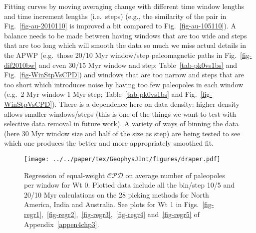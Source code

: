 Fitting curves by moving averaging change with different time window lengths and
time increment lengths (i.e.\ steps) (e.g., the similarity of the pair in
Fig.~\ref{fig-au-2010110} is improved a bit compared to
Fig.~\ref{fig-au-105110}). A balance needs to be made between having windows
that are too wide and steps that are too long which will smooth the data so much
we miss actual details in the APWP (e.g.\ those 20/10 Myr window/step
paleomagnetic paths in Fig.~\ref{fig-dif2010bw} and even 30/15 Myr window and
step; Table~\ref{tab-pk0vs1bs} and Fig.~\ref{fig-WinStpVsCPD}) and windows that
are too narrow and steps that are too short which introduces noise by having too
few paleopoles in each window (e.g.\ 2 Myr window 1 Myr step;
Table~\ref{tab-pk0vs1bs} and Fig.~\ref{fig-WinStpVsCPD}). There is a dependence
here on data density: higher density allows smaller windows/steps (this is one
of the things we want to test with selective data removal in future work). A
variety of ways of binning the data (here 30 Myr window size and
half of the size as step) are being tested to see which one produces the better
and more appropriately smoothed fit.

\begin{figure}
  \centering
  \texttt{[image: ../../paper/tex/GeophysJInt/figures/draper.pdf]}
  \caption[Regression of $\mathcal{CPD}$ on average number of paleopoles per
    window for Wt 0]{Regression of equal-weight $\mathcal{CPD}$ on average
    number of paleopoles per window for Wt 0. Plotted data include all the
    bin/step 10/5 and 20/10 Myr calculations on the 28 picking methods for North
    America, India and Australia. See plots for Wt 1 in
    Figs.~\ref{fig-regr1},~\ref{fig-regr2},~\ref{fig-regr3},~\ref{fig-regr4}
    and~\ref{fig-regr5} of Appendix~\ref{appen4chp3}.}\label{fig-regr}
\end{figure}

